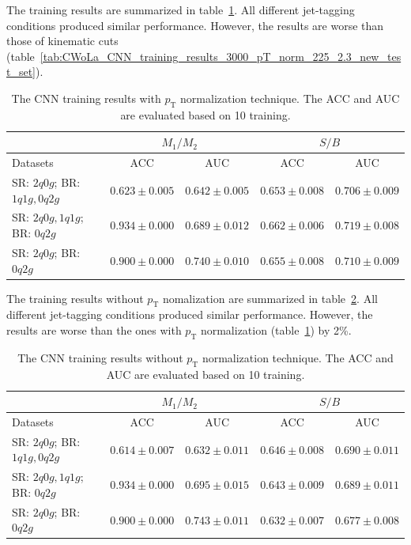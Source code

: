 \documentclass[12pt]{article}
\begin{document}
    The training results are summarized in table~\ref{tab:CWoLa_CNN_training_results_3000_pT_norm_jet_tagging}. All different jet-tagging conditions produced similar performance. However, the results are worse than those of kinematic cuts (table~\ref{tab:CWoLa_CNN_training_results_3000_pT_norm_225_2.3_new_test_set}).
    \begin{table}[htpb]
        \centering
        \caption{The CNN training results with $p_{\text{T}}$ normalization technique. The ACC and AUC are evaluated based on 10 training.}
        \label{tab:CWoLa_CNN_training_results_3000_pT_norm_jet_tagging}
        \begin{tabular}{l|cc|cc}
                                         & \multicolumn{2}{c|}{$M_1 / M_2$}      & \multicolumn{2}{c}{$S / B$}           \\ \hline
            Datasets                     & ACC               & AUC               & ACC               & AUC               \\ \hline
            SR: $2q0g$; BR: $1q1g, 0q2g$ & $0.623 \pm 0.005$ & $0.642 \pm 0.005$ & $0.653 \pm 0.008$ & $0.706 \pm 0.009$ \\
            SR: $2q0g, 1q1g$; BR: $0q2g$ & $0.934 \pm 0.000$ & $0.689 \pm 0.012$ & $0.662 \pm 0.006$ & $0.719 \pm 0.008$ \\
            SR: $2q0g$; BR: $0q2g$       & $0.900 \pm 0.000$ & $0.740 \pm 0.010$ & $0.655 \pm 0.008$ & $0.710 \pm 0.009$
        \end{tabular}
    \end{table}

    The training results without $p_{\text{T}}$ nomalization are summarized in table~\ref{tab:CWoLa_CNN_training_results_3000_jet_tagging}. All different jet-tagging conditions produced similar performance. However, the results are worse than the ones with $p_{\text{T}}$ normalization (table~\ref{tab:CWoLa_CNN_training_results_3000_pT_norm_jet_tagging}) by 2\%.
    \begin{table}[htpb]
        \centering
        \caption{The CNN training results without $p_{\text{T}}$ normalization technique. The ACC and AUC are evaluated based on 10 training.}
        \label{tab:CWoLa_CNN_training_results_3000_jet_tagging}
        \begin{tabular}{l|cc|cc}
                                         & \multicolumn{2}{c|}{$M_1 / M_2$}      & \multicolumn{2}{c}{$S / B$}           \\ \hline
            Datasets                     & ACC               & AUC               & ACC               & AUC               \\ \hline
            SR: $2q0g$; BR: $1q1g, 0q2g$ & $0.614 \pm 0.007$ & $0.632 \pm 0.011$ & $0.646 \pm 0.008$ & $0.690 \pm 0.011$ \\
            SR: $2q0g, 1q1g$; BR: $0q2g$ & $0.934 \pm 0.000$ & $0.695 \pm 0.015$ & $0.643 \pm 0.009$ & $0.689 \pm 0.011$ \\
            SR: $2q0g$; BR: $0q2g$       & $0.900 \pm 0.000$ & $0.743 \pm 0.011$ & $0.632 \pm 0.007$ & $0.677 \pm 0.008$
        \end{tabular}
    \end{table}
\end{document}
